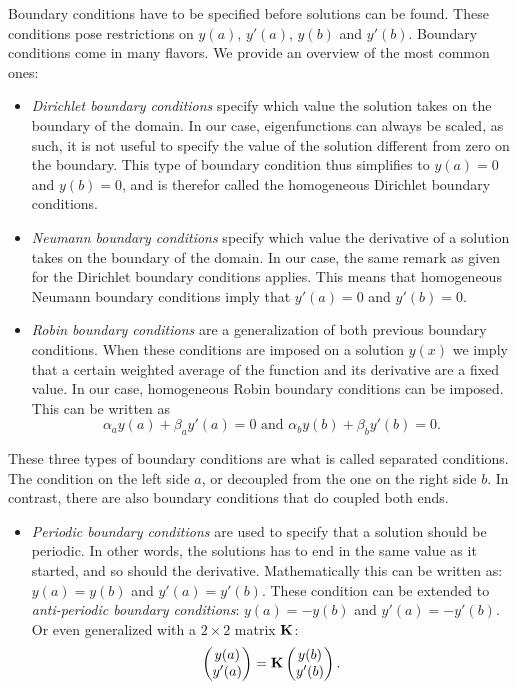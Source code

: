 Boundary conditions have to be specified before solutions can be found. These conditions pose restrictions on $y(a)$, $y'(a)$, $y(b)$ and $y'(b)$. Boundary conditions come in many flavors. We provide an overview of the most common ones:
\begin{itemize}
    \item \emph{Dirichlet boundary conditions} specify which value the solution takes on the boundary of the domain. In our case, eigenfunctions can always be scaled, as such, it is not useful to specify the value of the solution different from zero on the boundary. This type of boundary condition thus simplifies to $y(a) = 0$ and $y(b) = 0$, and is therefor called the homogeneous Dirichlet boundary conditions.
    \item \emph{Neumann boundary conditions} specify which value the derivative of a solution takes on the boundary of the domain. In our case, the same remark as given for the Dirichlet boundary conditions applies. This means that homogeneous Neumann boundary conditions imply that $y'(a) = 0$ and $y'(b) = 0$.
    \item \emph{Robin boundary conditions} are a generalization of both previous boundary conditions. When these conditions are imposed on a solution $y(x)$ we imply that a certain weighted average of the function and its derivative are a fixed value. In our case, homogeneous Robin boundary conditions can be imposed. This can be written as
          $$
              \alpha_a y(a) + \beta_a y'(a) = 0 \text{ and } \alpha_b y(b) + \beta_b y'(b) = 0  \text{.}
          $$
\end{itemize}
These three types of boundary conditions are what is called separated conditions. The condition on the left side $a$, or decoupled from the one on the right side $b$. In contrast, there are also boundary conditions that do coupled both ends.
\begin{itemize}
    \item \emph{Periodic boundary conditions} are used to specify that a solution should be periodic. In other words, the solutions has to end in the same value as it started, and so should the derivative. Mathematically this can be written as: $y(a) = y(b)$ and $y'(a) = y'(b)$. These condition can be extended to \emph{anti-periodic boundary conditions}: $y(a) = -y(b)$ and $y'(a) = -y'(b)$. Or even generalized with a $2 \times 2$ matrix $\vb{K}$:
          $$
              \begin{pmatrix} y(a) \\ y'(a) \end{pmatrix} = \vb{K} \begin{pmatrix} y(b) \\ y'(b) \end{pmatrix}\text{.}
          $$
\end{itemize}

